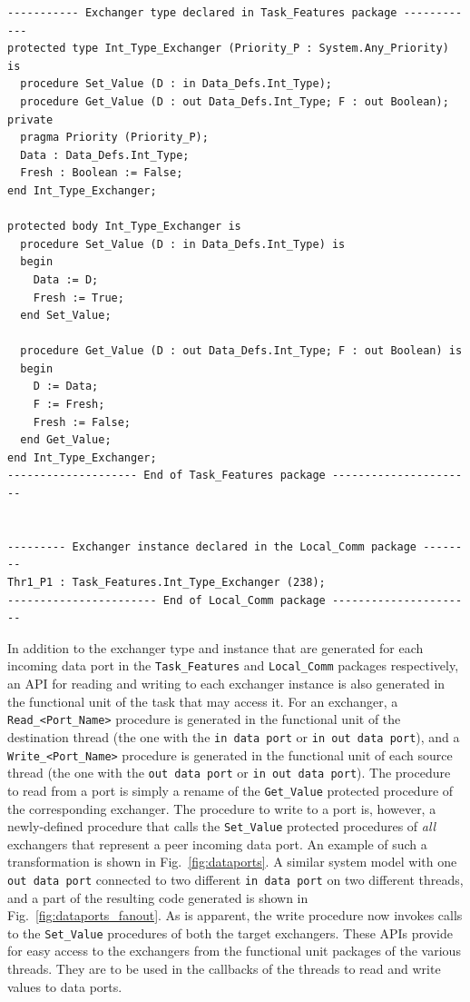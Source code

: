 \begin{minipage}{\listingwidth}
\lstset{language=ada}
\begin{lstlisting}[label=exchangerSpec,caption=The
\texttt{Int\_Type\_Exchanger} generated type]
----------- Exchanger type declared in Task_Features package ------------
protected type Int_Type_Exchanger (Priority_P : System.Any_Priority) is  
  procedure Set_Value (D : in Data_Defs.Int_Type);                       
  procedure Get_Value (D : out Data_Defs.Int_Type; F : out Boolean);     
private
  pragma Priority (Priority_P);
  Data : Data_Defs.Int_Type;
  Fresh : Boolean := False;
end Int_Type_Exchanger;

protected body Int_Type_Exchanger is
  procedure Set_Value (D : in Data_Defs.Int_Type) is
  begin
    Data := D; 
    Fresh := True;
  end Set_Value;

  procedure Get_Value (D : out Data_Defs.Int_Type; F : out Boolean) is
  begin
    D := Data; 
    F := Fresh; 
    Fresh := False;
  end Get_Value;
end Int_Type_Exchanger;
-------------------- End of Task_Features package ----------------------


--------- Exchanger instance declared in the Local_Comm package --------
Thr1_P1 : Task_Features.Int_Type_Exchanger (238);
----------------------- End of Local_Comm package ----------------------
\end{lstlisting}
\end{minipage}

In addition to the exchanger type and instance that are generated for
each incoming data port in the \texttt{Task\_Features} and
\texttt{Local\_Comm} packages respectively, an API for reading and
writing to each exchanger instance is also generated in the functional
unit of the task that may access it. For an exchanger, a
\texttt{Read\_<Port\_Name>} procedure is generated in the functional
unit of the destination thread (the one with the \texttt{in data port}
or \texttt{in out data port}), and a \texttt{Write\_<Port\_Name>}
procedure is generated in the functional unit of each source thread
(the one with the \texttt{out data port} or \texttt{in out data
  port}). The procedure to read from a port is simply a rename of the
\texttt{Get\_Value} protected procedure of the corresponding
exchanger. The procedure to write to a port is, however, a
newly-defined procedure that calls the \texttt{Set\_Value} protected
procedures of \emph{all} exchangers that represent a peer incoming
data port. An example of such a transformation is shown in
Fig.~\ref{fig:dataports}. A similar system model with one \texttt{out
  data port} connected to two different \texttt{in data port} on two
different threads, and a part of the resulting code generated is shown
in Fig.~\ref{fig:dataports_fanout}. As is apparent, the write
procedure now invokes calls to the \texttt{Set\_Value} procedures of
both the target exchangers. These APIs provide for easy access to the
exchangers from the functional unit packages of the various
threads. They are to be used in the callbacks of the threads to read
and write values to data ports.

